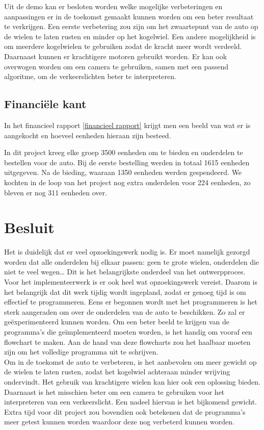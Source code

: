 \documentclass[a4paper,twoside,kulak]{kulakreport} %
\begin{document}
Uit de demo kan er besloten worden welke mogelijke verbeteringen en aanpassingen er in de toekomst gemaakt kunnen worden om een beter resultaat te verkrijgen. Een eerste verbetering zou zijn om het zwaartepunt van de auto op de wielen te laten rusten en minder op het kogelwiel. Een andere mogelijkheid is om meerdere kogelwielen te gebruiken zodat de kracht meer wordt verdeeld. Daarnaast kunnen er krachtigere motoren gebruikt worden. Er kan ook overwogen worden om een camera te gebruiken, samen met een passend algoritme, om de verkeerslichten beter te interpreteren.
\\

\subsection{Financiële kant} 
In het financieel rapport \ref{financieel rapport} krijgt men een beeld van wat er is aangekocht en hoeveel eenheden hieraan zijn besteed.  

In dit project kreeg elke groep 3500 eenheden om te bieden en onderdelen te bestellen voor de auto. Bij de eerste bestelling werden in totaal 1615 eenheden uitgegeven. Na de bieding, waaraan 1350 eenheden werden gespendeerd. We kochten in de loop van het project nog extra onderdelen voor 224 eenheden, zo bleven er nog 311 eenheden over.
\\


\section{Besluit}
Het is duidelijk dat er veel opzoekingswerk nodig is. Er moet namelijk gezorgd worden dat alle onderdelen bij elkaar passen: geen te grote wielen, onderdelen die niet te veel wegen… Dit is het belangrijkste onderdeel van het ontwerpproces.\\
Voor het implementeerwerk is er ook heel wat opzoekingswerk vereist. Daarom is het belangrijk dat dit werk tijdig wordt ingepland, zodat er genoeg tijd is om effectief te programmeren. Eens er begonnen wordt met het programmeren is het sterk aangeraden om over de onderdelen van de auto te beschikken. Zo zal er geëxperimenteerd kunnen worden. Om een beter beeld te krijgen van de programma’s die geïmplementeerd moeten worden, is het handig om vooraf een flowchart te maken. Aan de hand van deze flowcharts zou het haalbaar moeten zijn om het volledige programma uit te schrijven.\\
Om in de toekomst de auto te verbeteren, is het aanbevolen om meer gewicht op de wielen te laten rusten, zodat het kogelwiel achteraan minder wrijving ondervindt. Het gebruik van krachtigere wielen kan hier ook een oplossing bieden. Daarnaast is het misschien beter om een camera te gebruiken voor het interpreteren van een verkeerslicht. Een nadeel hiervan is het bijkomend gewicht. 
Extra tijd voor dit project zou bovendien ook betekenen dat de programma’s meer getest kunnen worden waardoor deze nog verbeterd kunnen worden.
\end{document}
